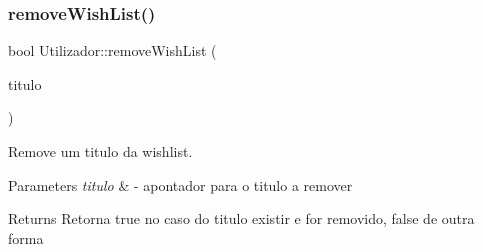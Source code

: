 \subsubsection{\texorpdfstring{remove\+Wish\+List()}{removeWishList()}}
{\footnotesize\ttfamily bool Utilizador\+::remove\+Wish\+List (\begin{DoxyParamCaption}\item[{\hyperlink{classTitulo}{Titulo} $\ast$}]{titulo }\end{DoxyParamCaption})}



Remove um titulo da wishlist. 


\begin{DoxyParams}{Parameters}
{\em titulo} & -\/ apontador para o titulo a remover \\
\hline
\end{DoxyParams}
\begin{DoxyReturn}{Returns}
Retorna true no caso do titulo existir e for removido, false de outra forma 
\end{DoxyReturn}

